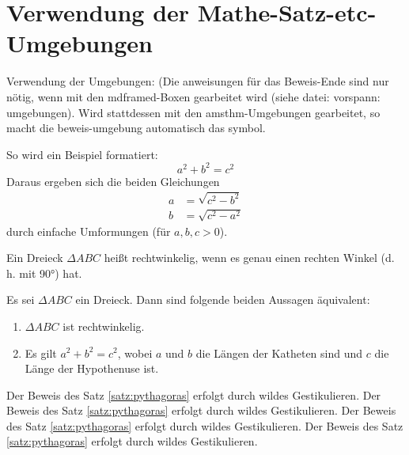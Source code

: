 




\section{Verwendung der Mathe-Satz-etc-Umgebungen}

Verwendung der Umgebungen: (Die anweisungen für das Beweis-Ende sind nur nötig, wenn mit den mdframed-Boxen gearbeitet wird (siehe datei: vorspann: umgebungen). Wird stattdessen  mit den amsthm-Umgebungen gearbeitet, so macht die beweis-umgebung automatisch das symbol.

 
\begin{bsp}\label{bsp:pythagoras}
So wird ein Beispiel formatiert:
\[
a^2 + b^2 = c^2
\]
Daraus ergeben sich die beiden Gleichungen
\begin{align*}
a &= \sqrt{c^2 - b^2} \\
b &= \sqrt{c^2 - a^2}
\end{align*}
durch einfache Umformungen (für $a,b,c>0$).
\end{bsp}

\begin{definition}\label{defi:rechtwinkeligesdreieck}
Ein Dreieck $\Delta ABC$ heißt rechtwinkelig, wenn es genau einen rechten Winkel (d.\,h. mit \ang{90}) hat. 
\end{definition}

\begin{satz}[Pythagoras]\label{satz:pythagoras}
Es sei $\Delta ABC$ ein Dreieck. Dann sind folgende beiden Aussagen äquivalent:
\begin{enumerate}[label={\alph*)}]
\item  $\Delta ABC$ ist rechtwinkelig.
\item  Es gilt $a^2 + b^2 = c^2$, wobei $a$ und $b$ die Längen der Katheten sind und $c$ die Länge der Hypothenuse ist.
\end{enumerate}
\end{satz}

\begin{beweis}
Der Beweis des Satz \ref{satz:pythagoras} erfolgt durch wildes Gestikulieren. Der Beweis des Satz \ref{satz:pythagoras} erfolgt durch wildes Gestikulieren. Der Beweis des Satz \ref{satz:pythagoras} erfolgt durch wildes Gestikulieren. Der Beweis des Satz \ref{satz:pythagoras} erfolgt durch wildes Gestikulieren. 
\beweisendeinzeile  %
\end{beweis}

